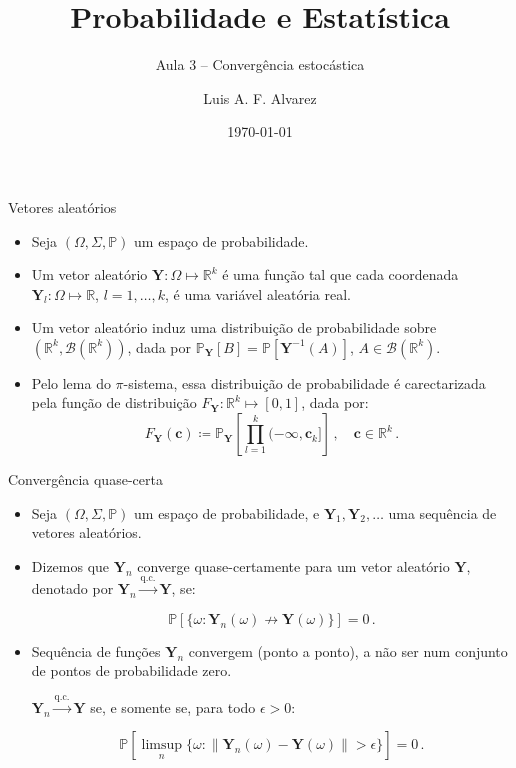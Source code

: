 \documentclass[11pt]{beamer}
\author{Luis A. F. Alvarez}
\title{Probabilidade e Estatística}
\subtitle{Aula 3 -- Convergência estocástica}
\date{\today}
\begin{document}
	
	\maketitle
	
	\begin{frame}{Vetores aleatórios}
		\begin{itemize}
			\item Seja $(\Omega,\Sigma,\mathbb{P})$ um espaço de probabilidade.
			\item Um vetor aleatório $\boldsymbol{Y}: \Omega \mapsto \mathbb{R}^k$ é uma função tal que cada coordenada $\boldsymbol{Y}_l : \Omega \mapsto \mathbb{R}$, $l=1,\ldots, k$, é uma variável aleatória real.
			\item Um vetor aleatório induz uma distribuição de probabilidade sobre $(\mathbb{R}^k,\mathcal{B}(\mathbb{R}^k))$, dada por $\mathbb{P}_{\boldsymbol{Y}}[B] = \mathbb{P}[\boldsymbol{Y}^{-1}(A)]$, $A \in \mathcal{B}(\mathbb{R}^k)$.
			\item Pelo lema do $\pi$-sistema, essa distribuição de probabilidade é carectarizada pela função de distribuição $F_{\boldsymbol{Y}}: \mathbb{R}^k \mapsto [0,1]$, dada por:
			$$F_{\boldsymbol{Y}}(\boldsymbol{c}) \coloneqq \mathbb{P}_{\boldsymbol{Y}}\left[\prod_{l=1}^k (-\infty,\boldsymbol{c}_k]\right]\, , \quad \boldsymbol{c} \in \mathbb{R}^k\, .$$
			
		\end{itemize}

	\end{frame}
	\begin{frame}{Convergência quase-certa}
		\begin{itemize}
			\item  Seja $(\Omega,\Sigma,\mathbb{P})$ um espaço de probabilidade, e $\boldsymbol{Y}_1,\boldsymbol{Y}_2,\ldots$ uma sequência de vetores aleatórios.
			\item Dizemos que $\boldsymbol{Y}_n$ converge quase-certamente para um vetor aleatório $\boldsymbol{Y}$, denotado por $\boldsymbol{Y}_n \overset{\text{q.c.}}{\to} \boldsymbol{Y}$, se:
			
			$$\mathbb{P}[\{\omega: \boldsymbol{Y}_n(\omega) \nrightarrow \boldsymbol{Y}(\omega)\}] = 0\, .$$
			\item Sequência de funções $\boldsymbol{Y}_n$ convergem (ponto a ponto), a não ser num conjunto de pontos de probabilidade zero.
			
			\begin{lemma}
				$\boldsymbol{Y}_n \overset{\text{q.c.}}{\to} \boldsymbol{Y}$ se, e somente se, para todo $\epsilon > 0$:
				
			$$\mathbb{P}\left[\limsup_n \{\omega: \lVert\boldsymbol{Y}_n(\omega)-\boldsymbol{Y}(\omega)\rVert > \epsilon\}\right]=0\, .$$
			\end{lemma} 
		\end{itemize}

	\end{frame}
	
\end{document}
